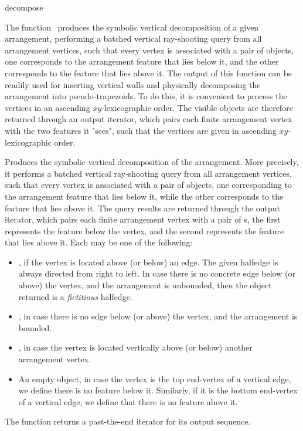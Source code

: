 \ccRefPageBegin

\begin{ccRefFunction}{decompose}

\ccDefinition

The function \ccRefName\ produces the symbolic vertical decomposition of a
given arrangement, performing a batched vertical ray-shooting query from
all arrangement vertices, such that every vertex is associated with a pair
of objects, one corresponds to the arrangement feature that lies below it,
and the other corresponds to the feature that lies above it.
The output of this function can be readily used for inserting vertical walls
and physically decomposing the arrangement into pseudo-trapezoids. To do
this, it is convenient to process the vertices in an ascending
$xy$-lexicographic order. The visible objects are therefore returned through
an output iterator, which pairs each finite arrangement vertex with the two
features it "sees", such that the vertices are given in ascending
$xy$-lexicographic order. 



Produces the symbolic vertical decomposition of the  arrangement.
More precisely, it performs a batched vertical ray-shooting query from all
arrangement vertices, such that every vertex is associated with a pair of
objects, one corresponding to the arrangement feature that lies below it,
while the other corresponds to the feature that lies above it. 
The query results are returned through the output iterator, which pairs
each finite arrangement vertex with a pair of s, the first
represents the feature below the vertex, and the second represents the
feature that lies above it. Each  may be one of the following:
\begin{itemize}
\item {}, if the vertex is located above (or
  below) an edge. The given halfedge is always directed from right to left.
  In case there is no concrete edge below (or above) the vertex, and
  the arrangement is unbounded, then the object returned is a
  \emph{fictitious} halfedge.
\item {}, in case there is no edge below (or above)
  the vertex, and the arrangement is bounded.
\item {}, in case the vertex is located vertically
  above (or below) another arrangement vertex.
\item An empty object, in case the vertex is the top end-vertex of
  a vertical edge, we define there is no feature below it. Similarly, if
  it is the bottom end-vertex of a vertical edge, we define that there
  is no feature above it.
\end{itemize}
The function returns a past-the-end iterator for its output sequence.


\end{ccRefFunction}
